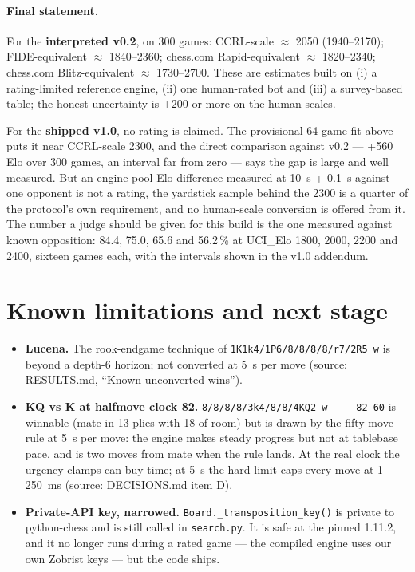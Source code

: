 \documentclass[11pt,a4paper]{article}
\newcommand{\src}[1]{{\small(source: #1)}}
\newcommand{\code}[1]{\texttt{#1}}
\begin{document}
\paragraph{Final statement.} For the \textbf{interpreted v0.2}, on 300 games: CCRL-scale $\approx$ 2050
(1940--2170); FIDE-equivalent $\approx$ 1840--2360; chess.com Rapid-equivalent $\approx$ 1820--2340;
chess.com Blitz-equivalent $\approx$ 1730--2700. These are estimates built on (i) a rating-limited
reference engine, (ii) one human-rated bot and (iii) a survey-based table; the honest uncertainty is
$\pm 200$ or more on the human scales.

For the \textbf{shipped v1.0}, no rating is claimed. The provisional 64-game fit above puts it near
CCRL-scale 2300, and the direct comparison against v0.2 --- +560 Elo over 300 games, an interval far from
zero --- says the gap is large and well measured. But an engine-pool Elo difference measured at 10~s +
0.1~s against one opponent is not a rating, the yardstick sample behind the 2300 is a quarter of the
protocol's own requirement, and no human-scale conversion is offered from it. The number a judge should
be given for this build is the one measured against known opposition: 84.4, 75.0, 65.6 and 56.2\,\% at
UCI\_Elo 1800, 2000, 2200 and 2400, sixteen games each, with the intervals shown in the v1.0 addendum.

\section{Known limitations and next stage}
\begin{itemize}[nosep]
  \item \textbf{Lucena.} The rook-endgame technique of \code{1K1k4/1P6/8/8/8/8/r7/2R5 w} is beyond a
        depth-6 horizon; not converted at 5~s per move \src{RESULTS.md, ``Known unconverted wins''}.
  \item \textbf{KQ vs K at halfmove clock 82.} \code{8/8/8/8/3k4/8/8/4KQ2 w - - 82 60} is winnable (mate
        in 13 plies with 18 of room) but is drawn by the fifty-move rule at 5~s per move: the engine makes
        steady progress but not at tablebase pace, and is two moves from mate when the rule lands. At the
        real clock the urgency clamps can buy time; at 5~s the hard limit caps every move at 1\,250~ms
        \src{DECISIONS.md item D}.
  \item \textbf{Private-API key, narrowed.} \code{Board.\_transposition\_key()} is private to python-chess
        and is still called in \code{search.py}. It is safe at the pinned 1.11.2, and it no longer runs
        during a rated game --- the compiled engine uses our own Zobrist keys --- but the code ships.
\end{itemize}
\end{document}
